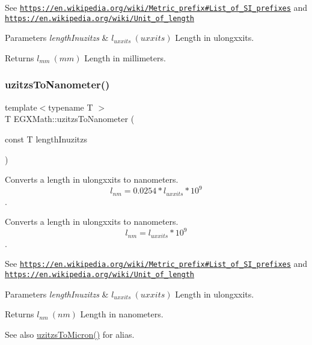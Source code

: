 See \href{https://en.wikipedia.org/wiki/Metric_prefix#List_of_SI_prefixes}{\tt https\+://en.\+wikipedia.\+org/wiki/\+Metric\+\_\+prefix\#\+List\+\_\+of\+\_\+\+S\+I\+\_\+prefixes} and \href{https://en.wikipedia.org/wiki/Unit_of_length}{\tt https\+://en.\+wikipedia.\+org/wiki/\+Unit\+\_\+of\+\_\+length} 
\begin{DoxyParams}{Parameters}
{\em length\+Inuzitzs} & $ l_{uxxits}\ (uxxits)$ Length in ulongxxits. \\
\hline
\end{DoxyParams}
\begin{DoxyReturn}{Returns}
$ l_{mm}\ (mm)$ Length in millimeters. 
\end{DoxyReturn}
\mbox{\label{group___e_g_x_math-_conversions-_length_conversions-_imperial-uzitzs-_s_i_ga6c21ffa2ef282d817d349c249eaaa21f}} 
\subsubsection{\texorpdfstring{uzitzs\+To\+Nanometer()}{uzitzsToNanometer()}}
{\footnotesize\ttfamily template$<$typename T $>$ \\
T E\+G\+X\+Math\+::uzitzs\+To\+Nanometer (\begin{DoxyParamCaption}\item[{const T}]{length\+Inuzitzs }\end{DoxyParamCaption})}



Converts a length in ulongxxits to nanometers. \[ l_{nm}=0.0254 * l_{uxxits} * 10^{9} \]. 

Converts a length in ulongxxits to nanometers. \[ l_{nm}=l_{uxxits} * 10^{9} \].

See \href{https://en.wikipedia.org/wiki/Metric_prefix#List_of_SI_prefixes}{\tt https\+://en.\+wikipedia.\+org/wiki/\+Metric\+\_\+prefix\#\+List\+\_\+of\+\_\+\+S\+I\+\_\+prefixes} and \href{https://en.wikipedia.org/wiki/Unit_of_length}{\tt https\+://en.\+wikipedia.\+org/wiki/\+Unit\+\_\+of\+\_\+length} 
\begin{DoxyParams}{Parameters}
{\em length\+Inuzitzs} & $ l_{uxxits}\ (uxxits)$ Length in ulongxxits. \\
\hline
\end{DoxyParams}
\begin{DoxyReturn}{Returns}
$ l_{nm}\ (nm)$ Length in nanometers. 
\end{DoxyReturn}
\begin{DoxySeeAlso}{See also}
\mbox{\hyperlink{group___e_g_x_math-_conversions-_length_conversions-_imperial-uzitzs-_non-_s_i_ga695a8fd8870537930d6378e99ad2aa9f}{uzitzs\+To\+Micron()}} for alias. 
\end{DoxySeeAlso}
\mbox{\label{group___e_g_x_math-_conversions-_length_conversions-_imperial-uzitzs-_s_i_gafe93d0226789fd78c2ffa4223eb6af7b}} 
